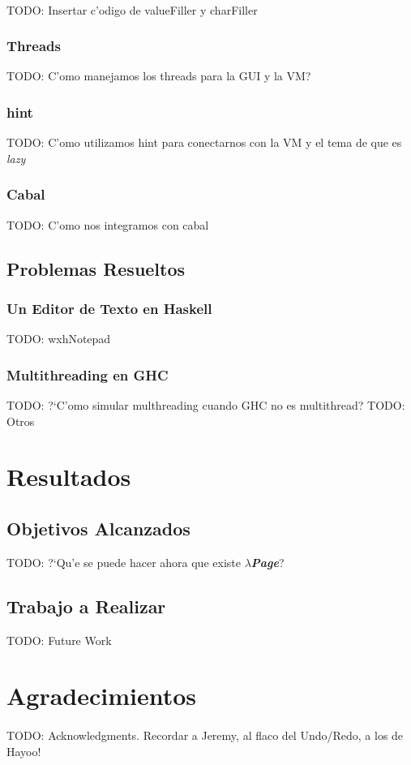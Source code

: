 \documentclass[a4paper]{article}
\newcommand{\hpage}{\textbf{\textsl{$\lambda$Page}}}
\begin{document}
\paragraph{}TODO: Insertar c'odigo de valueFiller y charFiller
\subsubsection{Threads}TODO: C'omo manejamos los threads para la GUI y la VM?
\subsubsection{hint}TODO: C'omo utilizamos hint para conectarnos con la VM y el tema de que es \textsl{lazy}
\subsubsection{Cabal}TODO: C'omo nos integramos con cabal
\subsection{Problemas Resueltos}
\subsubsection{Un Editor de Texto en Haskell}TODO: wxhNotepad
\subsubsection{Multithreading en GHC}TODO: ?`C'omo simular multhreading cuando GHC no es multithread?
TODO: Otros

\section{Resultados}
\subsection{Objetivos Alcanzados}TODO: ?`Qu'e se puede hacer ahora que existe \hpage?
\subsection{Trabajo a Realizar} TODO: Future Work

\section{Agradecimientos}
\paragraph{}TODO: Acknowledgments.  Recordar a Jeremy, al flaco del Undo/Redo, a los de Hayoo!
\end{document}
